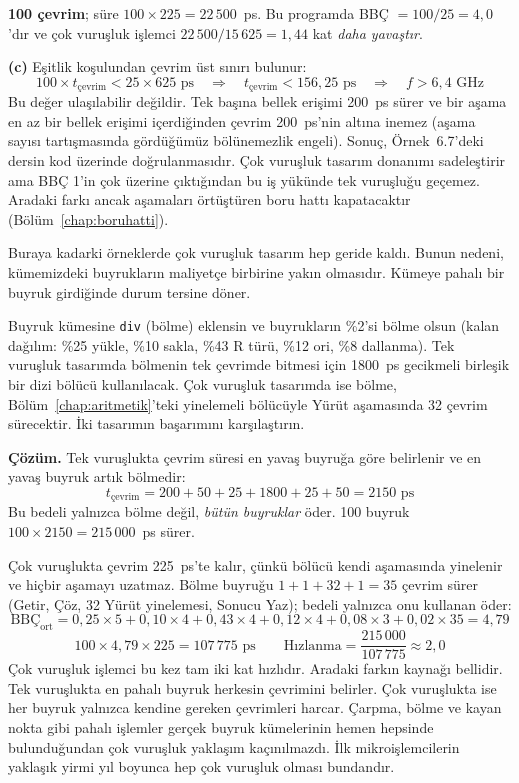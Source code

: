 \begin{ornek}
\textbf{100 çevrim}; süre $100 \times 225 = 22\,500$~ps. Bu programda BBÇ $= 100/25 = 4{,}0$'dır ve çok vuruşluk işlemci $22\,500 / 15\,625 = 1{,}44$ kat \emph{daha yavaştır}.

\textbf{(c)} Eşitlik koşulundan çevrim üst sınırı bulunur:
\[
100 \times t_{\text{çevrim}} < 25 \times 625 \text{ ps} \quad\Rightarrow\quad t_{\text{çevrim}} < 156{,}25 \text{ ps} \quad\Rightarrow\quad f > 6{,}4 \text{ GHz}
\]
Bu değer ulaşılabilir değildir. Tek başına bellek erişimi 200~ps sürer ve bir aşama en az bir bellek erişimi içerdiğinden çevrim 200~ps'nin altına inemez (aşama sayısı tartışmasında gördüğümüz bölünemezlik engeli). Sonuç, Örnek~6.7'deki dersin kod üzerinde doğrulanmasıdır. Çok vuruşluk tasarım donanımı sadeleştirir ama BBÇ 1'in çok üzerine çıktığından bu iş yükünde tek vuruşluğu geçemez. Aradaki farkı ancak aşamaları örtüştüren boru hattı kapatacaktır (Bölüm~\ref{chap:boruhatti}).
\end{ornek}

Buraya kadarki örneklerde çok vuruşluk tasarım hep geride kaldı. Bunun nedeni, kümemizdeki buyrukların maliyetçe birbirine yakın olmasıdır. Kümeye pahalı bir buyruk girdiğinde durum tersine döner.

\begin{ornek}
Buyruk kümesine \texttt{div} (bölme) eklensin ve buyrukların \%2'si bölme olsun (kalan dağılım: \%25 yükle, \%10 sakla, \%43 R türü, \%12 ori, \%8 dallanma). Tek vuruşluk tasarımda bölmenin tek çevrimde bitmesi için 1800~ps gecikmeli birleşik bir dizi bölücü kullanılacak. Çok vuruşluk tasarımda ise bölme, Bölüm~\ref{chap:aritmetik}'teki yinelemeli bölücüyle Yürüt aşamasında 32 çevrim sürecektir. İki tasarımın başarımını karşılaştırın.

\tcblower
\textbf{Çözüm.} Tek vuruşlukta çevrim süresi en yavaş buyruğa göre belirlenir ve en yavaş buyruk artık bölmedir:
\[
t_{\text{çevrim}} = 200 + 50 + 25 + 1800 + 25 + 50 = 2150 \text{ ps}
\]
Bu bedeli yalnızca bölme değil, \emph{bütün buyruklar} öder. 100 buyruk $100 \times 2150 = 215\,000$~ps sürer.

Çok vuruşlukta çevrim 225~ps'te kalır, çünkü bölücü kendi aşamasında yinelenir ve hiçbir aşamayı uzatmaz. Bölme buyruğu $1 + 1 + 32 + 1 = 35$ çevrim sürer (Getir, Çöz, 32 Yürüt yinelemesi, Sonucu Yaz); bedeli yalnızca onu kullanan öder:
\[
\text{BBÇ}_{\text{ort}} = 0{,}25 \times 5 + 0{,}10 \times 4 + 0{,}43 \times 4 + 0{,}12 \times 4 + 0{,}08 \times 3 + 0{,}02 \times 35 = 4{,}79
\]
\[
100 \times 4{,}79 \times 225 = 107\,775 \text{ ps} \qquad \text{Hızlanma} = \frac{215\,000}{107\,775} \approx 2{,}0
\]
Çok vuruşluk işlemci bu kez tam iki kat hızlıdır. Aradaki farkın kaynağı bellidir. Tek vuruşlukta en pahalı buyruk herkesin çevrimini belirler. Çok vuruşlukta ise her buyruk yalnızca kendine gereken çevrimleri harcar. Çarpma, bölme ve kayan nokta gibi pahalı işlemler gerçek buyruk kümelerinin hemen hepsinde bulunduğundan çok vuruşluk yaklaşım kaçınılmazdı. İlk mikroişlemcilerin yaklaşık yirmi yıl boyunca hep çok vuruşluk olması bundandır.
\end{ornek}

